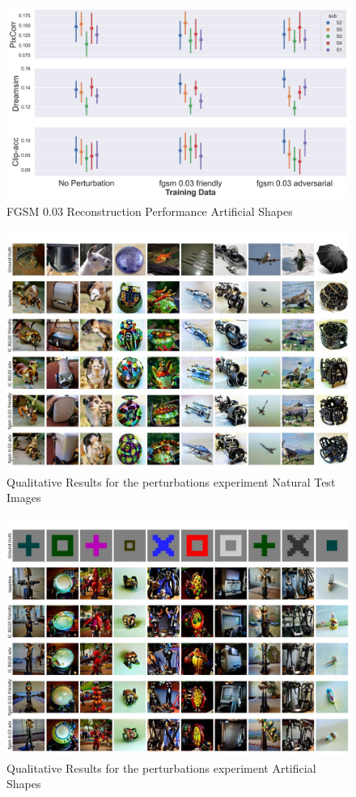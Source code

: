 \begin{figure}[ht]
    \centering
    \includegraphics[width=1\textwidth]{plots/advpert_reconstruction_art_fgsm_0.03.png}
    \caption{FGSM 0.03 Reconstruction Performance Artificial Shapes}\label{fig:advpert_reconstruction_art_fgsm_0.03}
\end{figure}

\begin{figure}[ht]
   \centering
   \includegraphics[width=1\textwidth]{plots/advpert_qual_test.JPEG}
   \caption{Qualitative Results for the perturbations experiment Natural Test Images}\label{fig:advpert_qual_test}
\end{figure}

\begin{figure}[ht]
   \centering
   \includegraphics[width=1\textwidth]{plots/advpert_qual_art.JPEG}
   \caption{Qualitative Results for the perturbations experiment Artificial Shapes}\label{fig:advpert_qual_art}
\end{figure}

